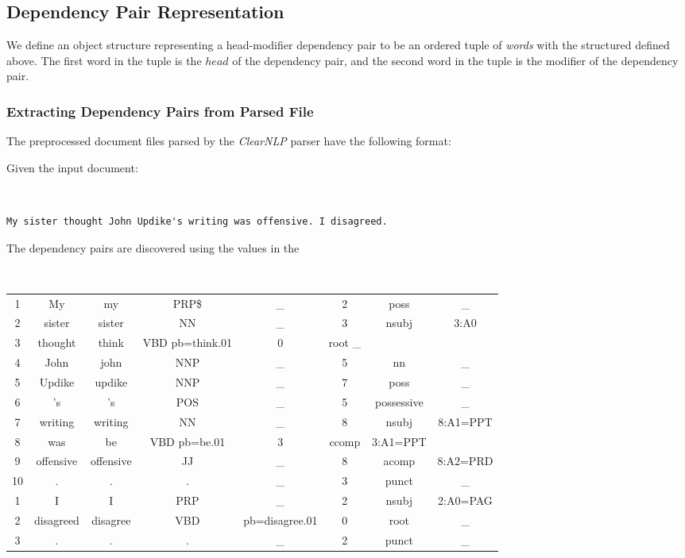 \documentclass[11pt]{article}
\begin{document}
\subsection{Dependency Pair Representation}

We define an object structure representing a head-modifier dependency pair to be an ordered tuple of \emph{words} with the structured defined above. The first word in the tuple is the $head$ of the dependency pair, and the second word in the tuple is the modifier of the dependency pair.  

\subsubsection{Extracting Dependency Pairs from Parsed File}

The preprocessed document files parsed by the \emph{ClearNLP} parser have the following format:

Given the input document:

\begin{shaded} \tt
\begin{verbatim}
My sister thought John Updike's writing was offensive. I disagreed.
\end{verbatim}
\end{shaded}

The dependency pairs are discovered using the values in the 

\begin{shaded} \tt
\footnotesize
\begin{tabular}{cccccccc}
1 &	My &	my &	PRP\$ &	 \_	& 2	 & poss	 &\_ \\
2 &	sister &	sister &	NN &	\_ &	3 &	nsubj &	3:A0 \\
3 &	thought &	think &	VBD	pb=think.01 &	0 &	root	\_ \\
4 &	John &	john	 &NNP &	\_ &	5 &	nn &	 \_ \\
5 &	Updike &	updike &	 NNP &	\_ &	7 &	poss & \_ \\
6 &	's &	's &	POS	 &\_ &	5 &	possessive &	\_ \\
7 &	writing &	writing &	NN &	\_ &	8 &	nsubj &	8:A1=PPT \\
8 &	was &	be &	VBD	pb=be.01 &	3 &	 ccomp &	3:A1=PPT \\
9 &	offensive &	offensive &	JJ & \_	& 8 &	acomp &	8:A2=PRD \\
10 & 	. & 	. &	. &	\_ &	3 &	punct &	\_ \\

1 &	I &	I &	PRP	 & \_	 & 2	 & nsubj &	2:A0=PAG \\
2 &	disagreed &	disagree &	VBD	 & pb=disagree.01 & 	0 & 	root	 & \_ \\
3 &	. &	. &	. &	\_ &	2 &	punct &	\_ \\
\end{tabular}
\end{shaded}
\end{document}
